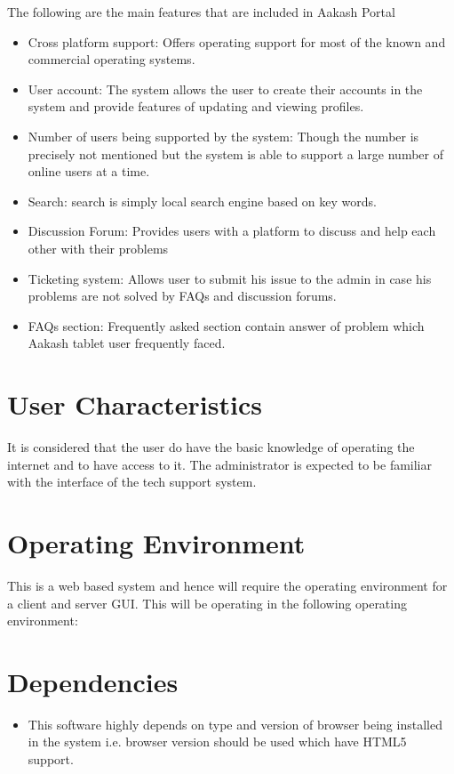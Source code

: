 \documentclass[letterpaper,10pt,english]{sphinxmanual}
\begin{document}
The following are the main features that are included in Aakash Portal
\begin{itemize}
\item {} 
Cross platform support: Offers operating support for most of the known and commercial operating systems.

\item {} 
User account: The system allows the user to create their accounts in the system and provide features of updating and viewing profiles.

\item {} 
Number of users being supported by the system: Though the number is precisely not mentioned but the system is able to support a large number of online users at a time.

\item {} 
Search: search is simply local search engine based on key words.

\item {} 
Discussion Forum: Provides users with a platform to discuss and help each other with their problems

\item {} 
Ticketing system: Allows user to submit his issue to the admin in case his problems are not solved by FAQs and discussion forums.

\item {} 
FAQs section: Frequently asked section contain answer of problem which Aakash tablet user frequently faced.

\end{itemize}


\section{User Characteristics}
\label{unifieddoc:user-characteristics}
It is considered that the user do have the basic knowledge of operating the internet and to have access to it. The administrator is expected to be familiar with the interface of the tech support system.


\section{Operating Environment}
\label{unifieddoc:operating-environment}
This is a web based system and hence will require the operating environment for a client and server GUI. This will be operating in the following operating environment:


\section{Dependencies}
\label{unifieddoc:dependencies}\begin{itemize}
\item {} 
This software highly depends on type and version of browser being installed in the system i.e. browser version should be used which have HTML5 support.

\end{itemize}
\end{document}
